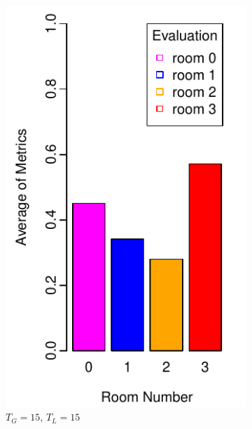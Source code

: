 \documentclass{llncs}
\begin{document}
\begin{figure}[h!]
\begin{subfigure}[b]{0.67\textwidth}
                \label{fig:exp1}
        \end{subfigure}
        
        \begin{subfigure}[b]{0.25\textwidth}
                \includegraphics[width=\textwidth]{PLOT/EVAL/eval5}
                \caption{$T_G = 15$, $T_L = 15$}
                \label{fig:eval1}
        \end{subfigure}%
        \qquad
        \begin{subfigure}[b]{0.67\textwidth}

\end{subfigure}
\end{figure}
\end{document}
